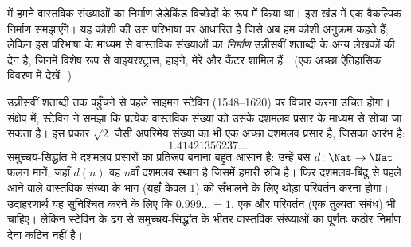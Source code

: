 \documentclass[../../../include/open-logic-section]{subfiles}
\begin{document}


 में हमने वास्तविक संख्याओं का निर्माण डेडेकिंड विच्छेदों के
रूप में किया था। इस खंड में एक वैकल्पिक निर्माण समझाएँगे। यह कौशी की उस
परिभाषा पर आधारित है जिसे अब हम कौशी अनुक्रम कहते हैं; लेकिन इस परिभाषा के
माध्यम से वास्तविक संख्याओं का \emph{निर्माण} उन्नीसवीं शताब्दी के अन्य लेखकों
की देन है, जिनमें विशेष रूप से वाइयरश्ट्रास, हाइने, मेरे और कैंटर शामिल हैं।
(एक अच्छा ऐतिहासिक विवरण \citeauthor{OConnorRobertson:RN}
\citeyear{OConnorRobertson:RN} में देखें।)

उन्नीसवीं शताब्दी तक पहुँचने से पहले साइमन स्टेविन (1548--1620) पर विचार करना
उचित होगा। संक्षेप में, स्टेविन ने समझा कि प्रत्येक वास्तविक संख्या को उसके
दशमलव प्रसार के माध्यम से सोचा जा सकता है। इस प्रकार $\sqrt{2}$ जैसी अपरिमेय
संख्या का भी एक अच्छा दशमलव प्रसार है, जिसका आरंभ है:
\[
	1.41421356237\ldots
\]
समुच्चय-सिद्धांत में दशमलव प्रसारों का प्रतिरूप बनाना बहुत आसान है: उन्हें बस
$d \colon \Nat \to \Nat$ फलन मानें, जहाँ $d(n)$ वह $n$वाँ दशमलव स्थान है
जिसमें हमारी रुचि है। फिर दशमलव-बिंदु से पहले आने वाले वास्तविक संख्या के भाग
(यहाँ केवल $1$) को सँभालने के लिए थोड़ा परिवर्तन करना होगा। उदाहरणार्थ यह
सुनिश्चित करने के लिए कि $0.999\ldots
= 1$, एक और परिवर्तन (एक तुल्यता संबंध) भी चाहिए। लेकिन स्टेविन के ढंग से
समुच्चय-सिद्धांत के भीतर वास्तविक संख्याओं का पूर्णतः कठोर निर्माण देना कठिन
नहीं है।
\end{document}
